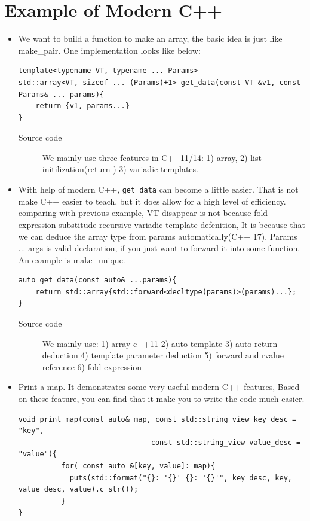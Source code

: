 \documentclass[a4paper,11pt,twoside]{book}
\begin{document}
\section{Example of Modern C++}
\begin{itemize}
    
	\item We want to build a function to make an array, the basic idea is just like make\_pair. One implementation looks like below:

\begin{lstlisting}
template<typename VT, typename ... Params>
std::array<VT, sizeof ... (Params)+1> get_data(const VT &v1, const Params& ... params){
	return {v1, params...}
}
\end{lstlisting}	

\begin{description}
	\item[Source code] We mainly use three features in C++11/14: 1) array, 2) list initilization(return ) 3) variadic templates.  
\end{description}

\item With help of modern C++, \texttt{get\_data} can become a little easier. That is not make C++ easier to teach, but it does allow for a high level of efficiency. comparing with previous example, VT disappear is not because fold expression substitude recursive variadic template defenition, It is because that we can deduce the array type from params automatically(C++ 17). Params ... args is valid declaration, if you just want to forward it into some function. An example is make\_unique. 
\begin{lstlisting}
auto get_data(const auto& ...params){
	return std::array{std::forward<decltype(params)>(params)...};
}
\end{lstlisting}
\begin{description}
    \item[Source code] We mainly use: 1) array c++11 2) auto template 3) auto return deduction 4) template parameter deduction 5) forward and rvalue reference 6) fold expression
\end{description}


	\item Print a map. It demonstrates some very useful modern C++ features, Based on these feature, you can find that it make you to write the code much easier. 
\begin{lstlisting}
void print_map(const auto& map, const std::string_view key_desc = "key",
							   const std::string_view value_desc = "value"){
		  for( const auto &[key, value]: map){
		  	puts(std::format("{}: '{}' {}: '{}'", key_desc, key, value_desc, value).c_str());
		  }		   
}
\end{lstlisting}	


\end{itemize}
\end{document}
